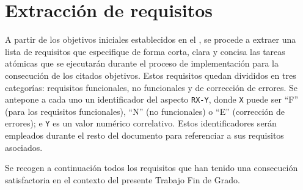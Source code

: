 \section{Extracción de requisitos}
\label{sec:requisitos}

A partir de los objetivos iniciales establecidos en el , se procede a extraer una lista de requisitos que especifique de forma corta, clara y concisa las tareas atómicas que se ejecutarán durante el proceso de implementación para la consecución de los citados objetivos. Estos requisitos quedan divididos en tres categorías: requisitos funcionales, no funcionales y de corrección de errores.
Se antepone a cada uno un identificador del aspecto \texttt{RX-Y}, donde \texttt X puede ser ``F'' (para los requisitos funcionales), ``N'' (no funcionales) o ``E'' (corrección de errores); e \texttt Y es un valor numérico correlativo. Estos identificadores serán empleados durante el resto del documento para referenciar a sus requisitos asociados.

Se recogen a continuación todos los requisitos que han tenido una consecución satisfactoria en el contexto del presente Trabajo Fin de Grado.

